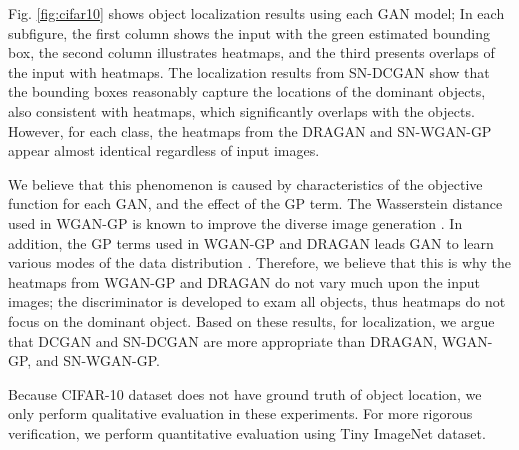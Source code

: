 \documentclass[runningheads]{llncs}
\begin{document}
Fig. \ref{fig:cifar10} shows object localization results using each GAN model; In each subfigure, the first column shows the input with the green estimated bounding box, the second column illustrates heatmaps, and the third presents overlaps of the input with heatmaps. The localization results from SN-DCGAN show that the bounding boxes reasonably capture the locations of the dominant objects, also consistent with heatmaps, which significantly overlaps with the objects. However, for each class, the heatmaps from the DRAGAN and SN-WGAN-GP appear almost identical regardless of input images.

We believe that this phenomenon is caused by characteristics of the objective function for each GAN, and the effect of the GP term. The Wasserstein distance used in WGAN-GP is known to improve the diverse image generation \cite{arjovsky2017wasserstein}. In addition, the GP terms used in WGAN-GP and DRAGAN leads GAN to learn various modes of the data distribution \cite{fedus2017many}. Therefore, we believe that this is why the heatmaps from WGAN-GP and DRAGAN do not vary much upon the input images; the discriminator is developed to exam all objects, thus heatmaps do not focus on the dominant object. Based on these results, for localization, we argue that DCGAN and SN-DCGAN are more appropriate than DRAGAN, WGAN-GP, and SN-WGAN-GP.

Because CIFAR-10 dataset does not have ground truth of object location, we only perform qualitative evaluation in these experiments. For more rigorous verification, we perform quantitative evaluation using Tiny ImageNet dataset.
\end{document}
